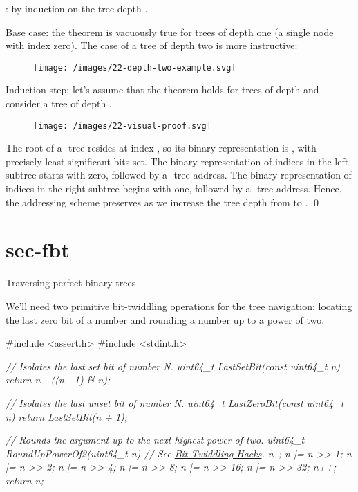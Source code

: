 \documentclass{article}
\begin{document}
: by induction on the tree depth .

Base case: the theorem is vacuously true for trees of depth one (a single node with index zero).
The case of a tree of depth two is more instructive:

\begin{figure}[grayscale-diagram]
  \texttt{[image: /images/22-depth-two-example.svg]}
\end{figure}

Induction step: let's assume that the theorem holds for trees of depth  and consider a tree of depth .

\begin{figure}[grayscale-diagram]
  \texttt{[image: /images/22-visual-proof.svg]}
\end{figure}

The root of a -tree resides at index , so its binary representation is , with precisely  least-significant bits set.
The binary representation of indices in the left subtree starts with zero, followed by a -tree address.
The binary representation of indices in the right subtree begins with one, followed by a -tree address.
Hence, the addressing scheme preserves as we increase the tree depth from  to .
\qed

\section{sec-fbt}{Traversing perfect binary trees}

We'll need two primitive bit-twiddling operations for the tree navigation: locating the last zero bit of a number and rounding a number up to a power of two.

\begin{code}[c]
#include <assert.h>
#include <stdint.h>

\em{// Isolates the last set bit of number N.}
uint64_t LastSetBit(const uint64_t n) {
    return n - ((n - 1) & n);
}

\em{// Isolates the last unset bit of number N.}
uint64_t LastZeroBit(const uint64_t n) {
    return LastSetBit(n + 1);
}

\em{// Rounds the argument up to the next highest power of two.}
uint64_t RoundUpPowerOf2(uint64_t n) {
    // See \href{https://graphics.stanford.edu/~seander/bithacks.html#RoundUpPowerOf2}{Bit Twiddling Hacks}.
    n--;
    n |= n >> 1;
    n |= n >> 2;
    n |= n >> 4;
    n |= n >> 8;
    n |= n >> 16;
    n |= n >> 32;
    n++;
    return n;
}
\end{code}
\end{document}
